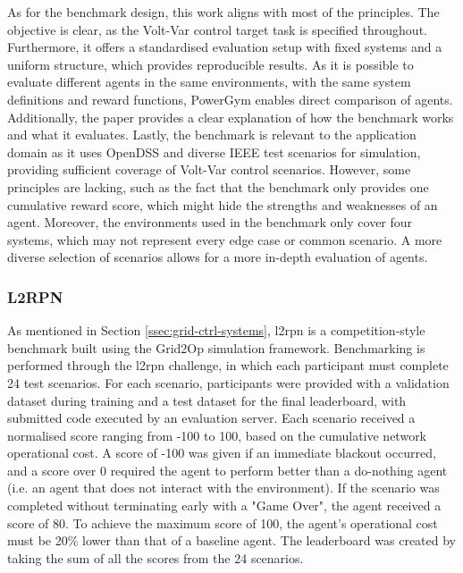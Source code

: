 As for the benchmark design, this work aligns with most of the principles. The objective is clear, as the Volt-Var control target task is specified throughout. Furthermore, it offers a standardised evaluation setup with fixed systems and a uniform structure, which provides reproducible results. As it is possible to evaluate different agents in the same environments, with the same system definitions and reward functions, PowerGym enables direct comparison of agents. Additionally, the paper provides a clear explanation of how the benchmark works and what it evaluates. Lastly, the benchmark is relevant to the application domain as it uses OpenDSS and diverse IEEE test scenarios for simulation, providing sufficient coverage of Volt-Var control scenarios. However, some principles are lacking, such as the fact that the benchmark only provides one cumulative reward score, which might hide the strengths and weaknesses of an agent. Moreover, the environments used in the benchmark only cover four systems, which may not represent every edge case or common scenario. A more diverse selection of scenarios allows for a more in-depth evaluation of agents.

\subsubsection{L2RPN}\label{sssec:l2rpn}
As mentioned in Section \ref{ssec:grid-ctrl-systems}, \ac{l2rpn} is a competition-style benchmark built using the Grid2Op simulation framework. Benchmarking is performed through the \ac{l2rpn} challenge, in which each participant must complete 24 test scenarios. For each scenario, participants were provided with a validation dataset during training and a test dataset for the final leaderboard, with submitted code executed by an evaluation server. Each scenario received a normalised score ranging from -100 to 100, based on the cumulative network operational cost. A score of -100 was given if an immediate blackout occurred, and a score over 0 required the agent to perform better than a do-nothing agent (i.e. an agent that does not interact with the environment). If the scenario was completed without terminating early with a "Game Over", the agent received a score of 80. To achieve the maximum score of 100, the agent's operational cost must be 20\% lower than that of a baseline agent. The leaderboard was created by taking the sum of all the scores from the 24 scenarios.


